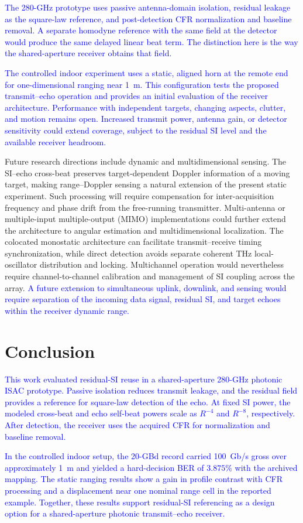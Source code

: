 \documentclass[10pt,journal]{IEEEtran}
\DeclareRobustCommand{\rev}[1]{\textcolor{blue}{#1}}
\begin{document}
\rev{The 280-GHz prototype uses passive antenna-domain isolation,
residual leakage as the square-law reference, and post-detection
CFR normalization and baseline removal. A separate homodyne
reference with the same field at the detector would produce the
same delayed linear beat term. The distinction here is the way
the shared-aperture receiver obtains that field.}

\rev{The controlled indoor experiment uses a static, aligned horn at
the remote end for one-dimensional ranging near 1~m. This
configuration tests the proposed transmit--echo operation and
provides an initial evaluation of the receiver architecture.
Performance with independent targets, changing aspects, clutter,
and motion remains open. Increased transmit power, antenna gain,
or detector sensitivity could extend coverage, subject to the
residual SI level and the available receiver headroom.}

Future research directions include dynamic and multidimensional
sensing. The SI--echo cross-beat preserves target-dependent Doppler information of a
moving target, making range--Doppler sensing a natural extension of
the present static experiment. Such processing will require
compensation for inter-acquisition frequency and phase drift from the
free-running transmitter. Multi-antenna or multiple-input multiple-output
(MIMO) implementations could
further extend the architecture to angular estimation and
multidimensional localization. The colocated monostatic architecture
can facilitate transmit--receive timing synchronization, while direct
detection avoids separate coherent THz local-oscillator distribution
and locking. Multichannel operation would nevertheless require
channel-to-channel calibration and management of SI coupling across
the array. \rev{A future extension to simultaneous uplink, downlink, and sensing
would require separation of the incoming data signal, residual SI,
and target echoes within the receiver dynamic range.}

\section{Conclusion}
\label{sec:conclusion}

\rev{This work evaluated residual-SI reuse in a shared-aperture 280-GHz
photonic ISAC prototype. Passive isolation reduces transmit
leakage, and the residual field provides a reference for
square-law detection of the echo. At fixed SI power, the
modeled cross-beat and echo self-beat powers scale as $R^{-4}$
and $R^{-8}$, respectively. After detection, the receiver uses
the acquired CFR for normalization and baseline removal.}

\rev{In the controlled indoor setup, the 20-GBd record carried
100~Gb/s gross over approximately 1~m and yielded a hard-decision
BER of $3.875\%$ with the archived mapping. The static ranging
results show a gain in profile contrast with CFR processing and
a displacement near one nominal range cell in the reported
example. Together, these results support residual-SI referencing
as a design option for a shared-aperture photonic transmit--echo
receiver.}



\end{document}
